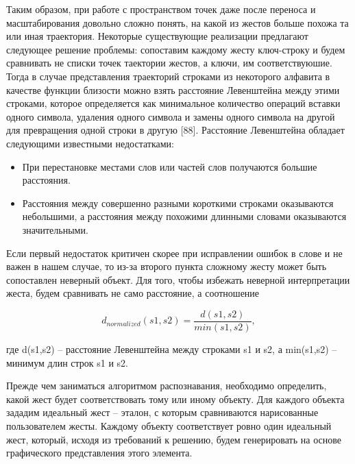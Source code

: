\documentclass[a5paper]{article}
\begin{document}
Таким образом, при работе с пространством точек даже после переноса и масштабирования довольно сложно понять, на какой из жестов 
больше похожа та или иная траектория. Некоторые существующие реализации предлагают следующее решение проблемы: сопоставим каждому жесту 
ключ-строку и будем сравнивать не списки точек таектории жестов, а ключи, им соответствуюшие. Тогда в случае представления траекторий 
строками из некоторого алфавита в качестве функции близости можно взять расстояние Левенштейна 
между этими строками, которое определяется как минимальное количество операций вставки одного символа, удаления одного символа и замены 
одного символа на другой для превращения одной строки в другую [88]. Расстояние Левенштейна обладает следующими известными недостатками:
\begin{itemize}
  \item При перестановке местами слов или частей слов получаются большие расстояния.
  \item Расстояния между совершенно разными короткими строками оказываются небольшими, а расстояния между похожими длинными словами 
оказываются значительными.
\end{itemize}
Если первый недостаток критичен скорее при исправлении ошибок в слове и не важен в нашем случае, то из-за второго пункта сложному 
жесту может быть сопоставлен неверный объект. Для того, чтобы избежать неверной интерпретации жеста, будем сравнивать не само расстояние, 
а соотношение 

\begin{equation}
\label{levenshtein}
d_{normalized}(s1,s2) = \frac{d(s1,s2)}{min(s1,s2)},
\end{equation}

где d(s1,s2) -- расстояние Левенштейна между строками s1 и s2, а min(s1,s2) -- минимум длин строк s1 и s2.

Прежде чем заниматься алгоритмом распознавания, необходимо определить, какой жест будет соответствовать тому или иному объекту. Для каждого 
объекта зададим идеальный жест -- эталон, с которым сравниваются нарисованные пользователем жесты. Каждому объекту соответствует ровно один 
идеальный жест, который, исходя из требований к решению, будем генерировать на основе графического представления этого элемента. 
\end{document}
